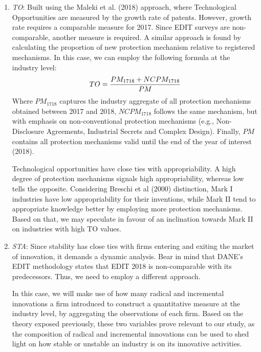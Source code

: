 \documentclass[12pt,a4paper]{article}
\begin{document}
\begin{enumerate}
	\item \textit{TO}: Built using the Maleki et al. (2018) approach, where Technological Opportunities are measured by the growth rate of patents. However, growth rate requires a comparable measure for 2017. Since EDIT surveys are non-comparable, another measure is required. A similar approach is found by calculating the proportion of new protection mechanism relative to registered mechanisms. In this case, we can employ the following formula at the industry level:
	\begin{equation}
		\centering
		TO = \dfrac{PM_{1718} + NCPM_{1718}}{PM}
	\end{equation}
	Where $PM_{1718}$ captures the industry aggregate of all protection mechanisms obtained between 2017 and 2018, $NCPM_{1718}$ follows the same mechanism, but with emphasis on non-conventional protection mechanisms (e.g., Non-Disclosure Agreements, Industrial Secrets and Complex Design). Finally, $PM$ contains all protection mechanisms valid until the end of the year of interest (2018). 
	
	Technological opportunities have close ties with appropriability. A high degree of protection mechanisms signals high appropriability, whereas low tells the opposite. Considering Breschi et al (2000) distinction, Mark I industries have low appropriability for their inventions, while Mark II tend to appropriate knowledge better by employing more protection mechanisms. Based on that, we may speculate in favour of an inclination towards Mark II on industries with high TO values. 
	
	\item \textit{STA}: Since stability has close ties with firms entering and exiting the market of innovation, it demands a dynamic analysis. Bear in mind that DANE’s EDIT methodology states that EDIT 2018 is non-comparable with its predecessors. Thus, we need to employ a different approach.  
	
	In this case, we will make use of how many radical and incremental innovations a firm introduced to construct a quantitative measure at the industry level, by aggregating the observations of each firm. Based on the theory exposed previously, these two variables prove relevant to our study, as the composition of radical and incremental innovations can be used to shed light on how stable or unstable an industry is on its innovative activities. 
	

\end{enumerate}
\end{document}
